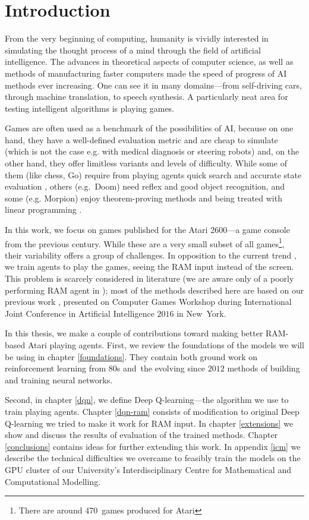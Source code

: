 \chapter*{Introduction}
From the very beginning of computing, humanity is vividly interested in simulating the thought process of a mind through the field of artificial intelligence. The advances in theoretical aspects of computer science, as well as methods of manufacturing faster computers made the speed of progress of AI methods ever increasing. One can see it in many domains---from self-driving cars, through machine translation, to speech synthesis. A particularly neat area for testing intelligent algorithms is playing games.

Games are often used as a benchmark of the possibilities of AI, because on one hand, they have a well-defined evaluation metric and are cheap to simulate (which is not the case e.g. with medical diagnosis or steering robots) and, on the other hand, they offer limitless variants and levels of difficulty. While some of them (like chess, Go) require from playing agents quick search and accurate state evaluation \cite{alphago}, others (e.g.~Doom) need reflex and good object recognition, and some (e.g. Morpion) enjoy theorem-proving methods and being treated with linear programming \cite{morpion}.

In this work, we focus on games published for the Atari 2600---a game console from the previous century. While these are a very small subset of all games\footnote{There are around 470~games produced for Atari}, their variability offers a group of challenges. In opposition to the current trend \cite{nips-dqn, nature-dqn, a3c}, we train agents to play the games, seeing the RAM input instead of the screen. This problem is scarcely considered in literature (we are aware only of a poorly performing RAM agent in \cite{ale}); most of the methods described here are based on our previous work \cite{our-paper}, presented on Computer Games Workshop during International Joint Conference in Artificial Intelligence $2016$ in New~York.

In this thesis, we make a couple of contributions toward making better RAM-based Atari playing agents. First, we review the foundations of the models we will be using in chapter \ref{foundations}. They contain both ground work on reinforcement learning from 80s and~the evolving since $2012$ methods of building and training neural networks.

Second, in chapter \ref{dqn}, we define Deep Q-learning---the algorithm we use to train playing agents.
Chapter \ref{dqn-ram} consists of modification to original Deep Q-learning we tried to make it work for RAM input.
In chapter \ref{extensions} we show and discuss the results of evaluation of the trained methods.
Chapter \ref{conclusions} contains ideas for further extending this work.
In appendix \ref{icm} we describe the technical difficulties we overcame to feasibly train the models on the GPU cluster of our University's Interdisciplinary Centre for Mathematical and Computational Modelling.
